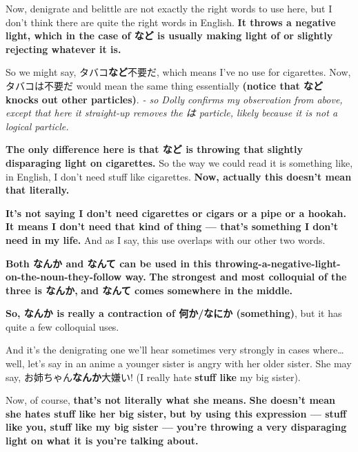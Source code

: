 {}

Now, denigrate and belittle are not exactly the right words to use here, but I don't think there are quite the right words in English. {\bf It throws a negative light, which in the case of など is usually making light of or slightly rejecting whatever it is.}

So we might say, タバコ{\bf など}不要だ, which means I've no use for cigarettes. Now, タバコは不要だ would mean the same thing essentially {\bf (notice that など knocks out other particles)}. {\em - so Dolly confirms my observation from above, except that here it straight-up removes the は particle, likely because it is not a logical particle.}

\thinrule

{\bf The only difference here is that など is throwing that slightly disparaging light on cigarettes.} So the way we could read it is something like, in English, I don't need stuff like cigarettes. {\bf Now, actually this doesn't mean that literally.}

{\bf It's not saying I don't need cigarettes or cigars or a pipe or a hookah.} {\bf It means I don't need that kind of thing --- that's something I don't need in my life.} And as I say, this use overlaps with our other two words.

{\bf Both なんか and なんて can be used in this throwing-a-negative-light-on-the-noun-they-follow way.} {\bf The strongest and most colloquial of the three is なんか,} {\bf and なんて comes somewhere in the middle.}

\stopsectionlevel

\stopsectionlevel

\startsectionlevel[title={なんか},reference={なんか}]

{\bf So, なんか is really a contraction of 何か/なにか (something)}, but it has quite a few colloquial uses.

{}

And it's the denigrating one we'll hear sometimes very strongly in cases where\ldots{} well, let's say in an anime a younger sister is angry with her older sister. She may say, お姉ちゃん{\bf なんか}大嫌い! (I really hate {\bf stuff like} my big sister).

Now, of course, {\bf that's not literally what she means.} {\bf She doesn't mean she hates stuff like her big sister,} {\bf but by using this expression --- stuff like you, stuff like my big sister --- } {\bf you're throwing a very disparaging light on what it is you're talking about.}

